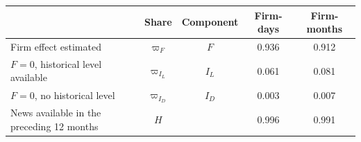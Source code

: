 \begin{tabular}{lcccc}
\toprule
 & Share & Component & Firm-days & Firm-months \\
\midrule
Firm effect estimated & $\varpi_F$ & $F$ & 0.936 & 0.912 \\
$F=0$, historical level available & $\varpi_{I_L}$ & $I_L$ & 0.061 & 0.081 \\
$F=0$, no historical level & $\varpi_{I_D}$ & $I_D$ & 0.003 & 0.007 \\
News available in the preceding 12 months & $H$ & & 0.996 & 0.991 \\
\bottomrule
\end{tabular}

